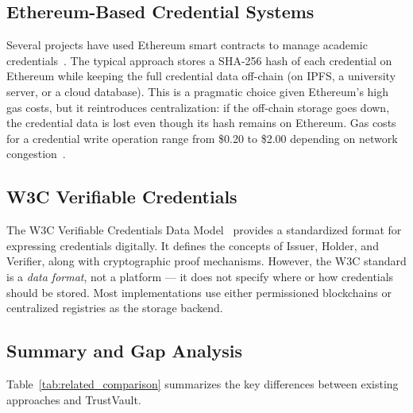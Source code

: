 \documentclass[journal]{IEEEtran}
\begin{document}
\subsection{Ethereum-Based Credential Systems}
Several projects have used Ethereum smart contracts to manage academic credentials~\cite{lizcano2020blockchain}. The typical approach stores a SHA-256 hash of each credential on Ethereum while keeping the full credential data off-chain (on IPFS, a university server, or a cloud database). This is a pragmatic choice given Ethereum's high gas costs, but it reintroduces centralization: if the off-chain storage goes down, the credential data is lost even though its hash remains on Ethereum. Gas costs for a credential write operation range from \$0.20 to \$2.00 depending on network congestion~\cite{wood2014ethereum}.

\subsection{W3C Verifiable Credentials}
The W3C Verifiable Credentials Data Model~\cite{w3c2022vc} provides a standardized format for expressing credentials digitally. It defines the concepts of Issuer, Holder, and Verifier, along with cryptographic proof mechanisms. However, the W3C standard is a \emph{data format}, not a platform — it does not specify where or how credentials should be stored. Most implementations use either permissioned blockchains or centralized registries as the storage backend.

\subsection{Summary and Gap Analysis}

Table~\ref{tab:related_comparison} summarizes the key differences between existing approaches and TrustVault.
\end{document}
